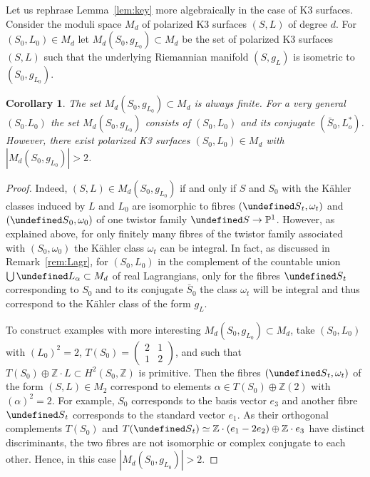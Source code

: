 \documentclass[11pt]{article}
\newtheorem{coro}[theo]{Corollary}
\theoremstyle{definition}
\numberwithin{equation}{section}
\numberwithin{figure}{section}
\numberwithin{table}{section}
\let\cal\undefined
\newcommand{\cal}{\mathcal}
\newcommand{\kl}{{\cal L}}
\newcommand{\ks}{{\cal S}}
\newcommand{\ZZ}{\mathbb{Z}}
\newcommand{\PP}{\mathbb{P}}
\renewcommand{\cong}{\simeq}
\begin{document}
Let us rephrase Lemma~\ref{lem:key} more algebraically in the case of K3 surfaces. Consider the moduli space $M_d$ of polarized K3 surfaces $(S,L)$ of degree $d$. For $(S_0,L_0)\in M_d$ let $M_d(S_0,g_{L_0})\subset M_d$ be the set of polarized K3 surfaces $(S,L)$ such that the underlying Riemannian manifold $(S,g_L)$ is isometric to $(S_0,g_{L_0})$.


\begin{coro}\label{cor:Omet}
The set $M_d(S_0,g_{L_0})\subset M_d$ is always finite. For a very general $(S_0.L_0)$ the set $M_d(S_0,g_{L_0})$ consists of $(S_0,L_0)$ and its conjugate $(\bar S_0,L_o^*)$. However, there exist polarized K3 surfaces $(S_0,L_0)\in M_d$ with $|M_d(S_0,g_{L_0})|>2$.
\end{coro}


\begin{proof}
Indeed, $(S,L)\in M_d(S_0,g_{L_0})$ if and only if $S$ and $S_0$ with the K\"ahler classes induced by $L$ and $L_0$ are isomorphic to fibres $(\ks_t,\omega_t)$ and $(\ks_0,\omega_0)$ of one twistor family $\ks\to\PP^1$. However, as explained above, for only finitely many fibres of the twistor family associated with $(S_0,\omega_0)$ the K\"ahler class $\omega_t$ can be integral. In fact, as discussed in Remark~\ref{rem:Lagr}, for $(S_0,L_0)$ in the complement of the countable union $\bigcup\kl_\alpha\subset M_d$ of real Lagrangians, only for the fibres $\ks_t$ corresponding to $S_0$ and to its conjugate $\bar S_0$ the class $\omega_t$ will be integral and thus correspond to the K\"ahler class of the form $g_L$.

To construct examples with more interesting $M_d(S_0,g_{L_0})\subset M_d$, take $(S_0,L_0)$ with $(L_0)^2=2$, $T(S_0)=\left(\begin{smallmatrix}2&1\\1&2\end{smallmatrix}\right)$, and such that $T(S_0)\oplus \ZZ\cdot L\subset H^2(S_0,\ZZ)$ is primitive. Then the fibres $(\ks_t,\omega_t)$ of the form $(S,L)\in M_2$ correspond to elements $\alpha\in T(S_0)\oplus\ZZ(2)$ with $(\alpha)^2=2$. For example, $S_0$ corresponds to the basis vector $e_3$ and another fibre $\ks_t$ corresponds to the standard vector $e_1$. As their orthogonal complements $T(S_0)$ and $T(\ks_t)\cong\ZZ\cdot (e_1-2e_2)\oplus\ZZ\cdot e_3$ have distinct discriminants, the two fibres are not isomorphic or complex conjugate to each other. Hence, in this case $|M_d(S_0,g_{L_0})|>2$.
\end{proof}
\end{document}
